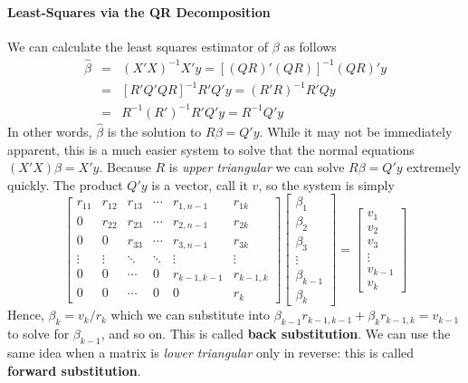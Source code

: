 \documentclass[12pt]{article}
\theoremstyle{definition}
\begin{document}
\paragraph{Least-Squares via the QR Decomposition} We can calculate the least squares estimator of $\beta$ as follows
\begin{eqnarray*}
  \widehat{\beta} &=& (X'X)^{-1} X'y = \left[(QR)' (QR) \right]^{-1} (QR)' y\\
    &=&\left[ R' Q' Q R\right]^{-1} R'Q' y = (R'R)^{-1} R'Q y\\
    &=& R^{-1} (R')^{-1} R' Q'y = R^{-1} Q'y
\end{eqnarray*}
In other words, $\widehat{\beta}$ is the solution to $R\beta = Q'y$. While it may not be immediately apparent, this is a much easier system to solve that the normal equations $(X'X) \beta = X'y$. Because $R$ is \emph{upper triangular} we can solve $R\beta = Q'y$ extremely quickly. The product $Q'y$ is a vector, call it $v$, so the system is simply
  $$\left[
    \begin{array}
      {cccccc}
      r_{11} & r_{12}  & r_{13}& \cdots & r_{1,n-1} & r_{1k} \\
      0 & r_{22} & r_{23}&\cdots & r_{2,n-1} & r_{2k}\\
      0&  0 &  r_{33}& \cdots & r_{3,n-1} & r_{3k}\\  
      \vdots & \vdots & \ddots& \ddots & \vdots & \vdots\\
      0 & 0 & \cdots &0  & r_{k-1, k-1} & r_{k-1, k} \\
      0 & 0 & \cdots & 0 & 0 & r_{k}
    \end{array}
  \right] \left[ \begin{array}
    {ccc}
    \beta_1 \\ \beta_2 \\ \beta_3 \\ \vdots \\ \beta_{k-1} \\ \beta_k
  \end{array}\right] = \left[ \begin{array}
    {c}
    v_1  \\ v_2  \\ v_3 \\  \vdots \\ v_{k-1} \\ v_{k}
  \end{array}\right]
  $$
Hence, $\beta_k = v_k / r_k$ which we can substitute into $\beta_{k-1} r_{k-1,k-1} + \beta_k r_{k-1,k} = v_{k-1}$ to solve for $\beta_{k-1}$, and so on. This is called \textbf{back substitution}. We can use the same idea when a matrix is \emph{lower triangular} only in reverse: this is called \textbf{forward substitution}.
\end{document}
